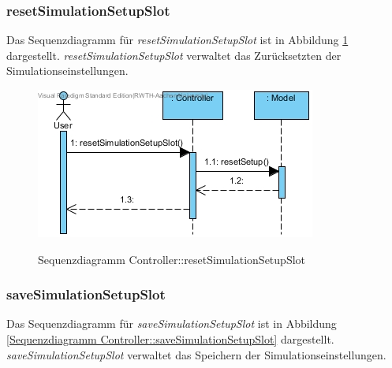 \subsubsection*{resetSimulationSetupSlot}

Das Sequenzdiagramm für \emph{resetSimulationSetupSlot} ist in Abbildung \ref{Sequenzdiagramm Controller::resetSimulationSetupSlot} dargestellt. \emph{resetSimulationSetupSlot} verwaltet das Zurücksetzten der Simulationseinstellungen.

\begin{figure}[H]
	\centering
	\includegraphics[scale=.8]{Bilder/Controller__resetSimulationSetupSlot().jpg}\\
	\caption{Sequenzdiagramm Controller::resetSimulationSetupSlot}
	\label{Sequenzdiagramm Controller::resetSimulationSetupSlot}
\end{figure}

\subsubsection*{saveSimulationSetupSlot}

Das Sequenzdiagramm für \emph{saveSimulationSetupSlot} ist in Abbildung \ref{Sequenzdiagramm Controller::saveSimulationSetupSlot} dargestellt. \emph{saveSimulationSetupSlot} verwaltet das Speichern der Simulationseinstellungen.

